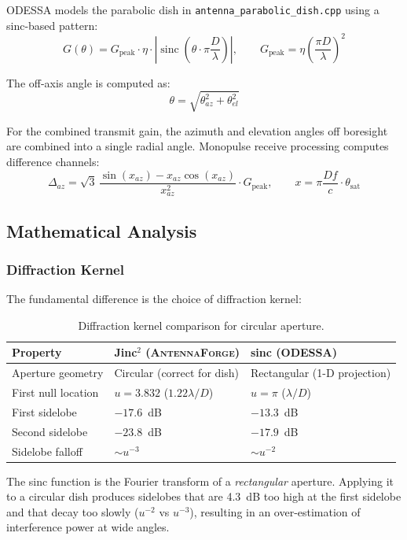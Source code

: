 \documentclass[11pt,a4paper]{article}
\newcommand{\AF}{\textsc{AntennaForge}}
\newcommand{\OD}{\textsc{ODESSA}}
\newcommand{\sinc}{\operatorname{sinc}}
\begin{document}
\OD{} models the parabolic dish in \texttt{antenna\_parabolic\_dish.cpp} using
a sinc-based pattern:
\begin{equation}
  G(\theta) = G_{\text{peak}} \cdot \eta \cdot
    \left| \sinc\!\left(\theta \cdot \pi \frac{D}{\lambda}\right) \right|,
  \qquad
  G_{\text{peak}} = \eta \left(\frac{\pi D}{\lambda}\right)^2
  \label{eq:od_dish}
\end{equation}

The off-axis angle is computed as:
\[
  \theta = \sqrt{\theta_{az}^2 + \theta_{el}^2}
\]

For the combined transmit gain, the azimuth and elevation angles off boresight
are combined into a single radial angle. Monopulse receive processing computes
difference channels:
\[
  \Delta_{az} = \sqrt{3}\,\frac{\sin(x_{az}) - x_{az}\cos(x_{az})}{x_{az}^2}
  \cdot G_{\text{peak}},
  \qquad
  x = \pi \frac{D f}{c} \cdot \theta_{\text{sat}}
\]

\subsection{Mathematical Analysis}

\subsubsection{Diffraction Kernel}

The fundamental difference is the choice of diffraction kernel:

\begin{table}[H]
\centering
\caption{Diffraction kernel comparison for circular aperture.}
\small
\begin{tabularx}{\textwidth}{l X X}
\toprule
\textbf{Property} & \textbf{Jinc$^2$ (\AF{})} & \textbf{sinc (\OD{})} \\
\midrule
Aperture geometry & Circular (correct for dish) & Rectangular (1-D projection) \\
First null location & $u = 3.832$ ($1.22\lambda/D$) & $u = \pi$ ($\lambda/D$) \\
First sidelobe & $-17.6$~dB & $-13.3$~dB \\
Second sidelobe & $-23.8$~dB & $-17.9$~dB \\
Sidelobe falloff & $\sim u^{-3}$ & $\sim u^{-2}$ \\
\bottomrule
\end{tabularx}
\end{table}

The sinc function is the Fourier transform of a \emph{rectangular} aperture.
Applying it to a circular dish produces sidelobes that are 4.3~dB too high at
the first sidelobe and that decay too slowly ($u^{-2}$ vs $u^{-3}$), resulting
in an over-estimation of interference power at wide angles.
\end{document}
